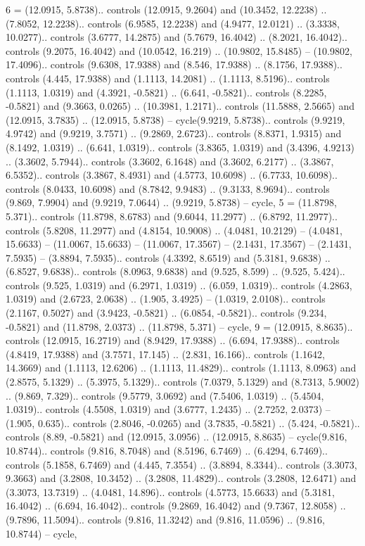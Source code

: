 {6} = {(12.0915, 5.8738).. controls (12.0915, 9.2604) and (10.3452, 12.2238) .. (7.8052, 12.2238).. controls (6.9585, 12.2238) and (4.9477, 12.0121) .. (3.3338, 10.0277).. controls (3.6777, 14.2875) and (5.7679, 16.4042) .. (8.2021, 16.4042).. controls (9.2075, 16.4042) and (10.0542, 16.219) .. (10.9802, 15.8485) -- (10.9802, 17.4096).. controls (9.6308, 17.9388) and (8.546, 17.9388) .. (8.1756, 17.9388).. controls (4.445, 17.9388) and (1.1113, 14.2081) .. (1.1113, 8.5196).. controls (1.1113, 1.0319) and (4.3921, -0.5821) .. (6.641, -0.5821).. controls (8.2285, -0.5821) and (9.3663, 0.0265) .. (10.3981, 1.2171).. controls (11.5888, 2.5665) and (12.0915, 3.7835) .. (12.0915, 5.8738) -- cycle(9.9219, 5.8738).. controls (9.9219, 4.9742) and (9.9219, 3.7571) .. (9.2869, 2.6723).. controls (8.8371, 1.9315) and (8.1492, 1.0319) .. (6.641, 1.0319).. controls (3.8365, 1.0319) and (3.4396, 4.9213) .. (3.3602, 5.7944).. controls (3.3602, 6.1648) and (3.3602, 6.2177) .. (3.3867, 6.5352).. controls (3.3867, 8.4931) and (4.5773, 10.6098) .. (6.7733, 10.6098).. controls (8.0433, 10.6098) and (8.7842, 9.9483) .. (9.3133, 8.9694).. controls (9.869, 7.9904) and (9.9219, 7.0644) .. (9.9219, 5.8738) -- cycle},
{5} = {(11.8798, 5.371).. controls (11.8798, 8.6783) and (9.6044, 11.2977) .. (6.8792, 11.2977).. controls (5.8208, 11.2977) and (4.8154, 10.9008) .. (4.0481, 10.2129) -- (4.0481, 15.6633) -- (11.0067, 15.6633) -- (11.0067, 17.3567) -- (2.1431, 17.3567) -- (2.1431, 7.5935) -- (3.8894, 7.5935).. controls (4.3392, 8.6519) and (5.3181, 9.6838) .. (6.8527, 9.6838).. controls (8.0963, 9.6838) and (9.525, 8.599) .. (9.525, 5.424).. controls (9.525, 1.0319) and (6.2971, 1.0319) .. (6.059, 1.0319).. controls (4.2863, 1.0319) and (2.6723, 2.0638) .. (1.905, 3.4925) -- (1.0319, 2.0108).. controls (2.1167, 0.5027) and (3.9423, -0.5821) .. (6.0854, -0.5821).. controls (9.234, -0.5821) and (11.8798, 2.0373) .. (11.8798, 5.371) -- cycle},
{9} = {(12.0915, 8.8635).. controls (12.0915, 16.2719) and (8.9429, 17.9388) .. (6.694, 17.9388).. controls (4.8419, 17.9388) and (3.7571, 17.145) .. (2.831, 16.166).. controls (1.1642, 14.3669) and (1.1113, 12.6206) .. (1.1113, 11.4829).. controls (1.1113, 8.0963) and (2.8575, 5.1329) .. (5.3975, 5.1329).. controls (7.0379, 5.1329) and (8.7313, 5.9002) .. (9.869, 7.329).. controls (9.5779, 3.0692) and (7.5406, 1.0319) .. (5.4504, 1.0319).. controls (4.5508, 1.0319) and (3.6777, 1.2435) .. (2.7252, 2.0373) -- (1.905, 0.635).. controls (2.8046, -0.0265) and (3.7835, -0.5821) .. (5.424, -0.5821).. controls (8.89, -0.5821) and (12.0915, 3.0956) .. (12.0915, 8.8635) -- cycle(9.816, 10.8744).. controls (9.816, 8.7048) and (8.5196, 6.7469) .. (6.4294, 6.7469).. controls (5.1858, 6.7469) and (4.445, 7.3554) .. (3.8894, 8.3344).. controls (3.3073, 9.3663) and (3.2808, 10.3452) .. (3.2808, 11.4829).. controls (3.2808, 12.6471) and (3.3073, 13.7319) .. (4.0481, 14.896).. controls (4.5773, 15.6633) and (5.3181, 16.4042) .. (6.694, 16.4042).. controls (9.2869, 16.4042) and (9.7367, 12.8058) .. (9.7896, 11.5094).. controls (9.816, 11.3242) and (9.816, 11.0596) .. (9.816, 10.8744) -- cycle},
